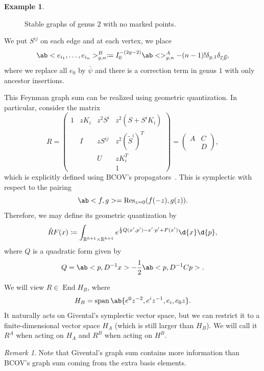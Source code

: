 \documentclass[10pt]{amsart}
\theoremstyle{definition}
\newtheorem{exm}[thm]{Example}
\theoremstyle{remark}
\newtheorem{rmk}[thm]{Remark}
\theoremstyle{plain}
\theoremstyle{definition}
\theoremstyle{remark}
\newcommand{\R}{\mathbb{R}}
\newcommand{\on}[1]{\operatorname{#1}}
\newcommand{\1}{\mathbf{1}}
\newcommand{\2}{\mathbf{2}}
\newcommand{\3}{\mathbf{3}}
\DeclareMathOperator{\End}{End}
\begin{document}
\begin{exm}
\begin{figure}[htpb]
\begin{center}
    \end{center}
    \caption{Stable graphs of genus $2$ with no marked points.}%
    \label{fig:stable graphs of genus 2}
    \end{figure}
    We put $S^{ij}$ on each edge and at each vertex, we place
    \[ \ab<e_{i_1}, \ldots, e_{i_n}>_{g,n}^{B} \coloneqq I_0^{-(2g-2)} \ab<>_{g,n}^A - (n-1)! \delta_{g,1} \delta_{\vec{\imath}, \vec{0}}, \]
    where we replace all $e_0$ by $\bar{\psi}$ and there is a correction term in genus $1$ with only ancestor insertions. 
\end{exm}

This Feynman graph sum can be realized using geometric quantization. In particular, consider the matrix
\[ R = \begin{pmatrix}
    1 & z K_i & z^2 S^i & z^2 (S + S^i K_i) \\
    & I & z S^{ij} & z^2 (\tilde{S}^i)^T \\
    & & U & z K_i^T \\
    & & & 1
\end{pmatrix} = \begin{pmatrix}
    A & C \\
    & D
\end{pmatrix}, \]
which is explicitly defined using BCOV's propagators~\cite{bcov}. This is symplectic with respect to the pairing
\[ \ab<f,g> = \on{Res}_{z=0} (f(-z), g(z)). \]
Therefore, we may define its geometric quantization by
\[ \hat{R} F(x) \coloneqq \int_{\R^{h+1} \times \R^{h+1}} e^{\frac{1}{2} Q(x',p') - x' \cdot p' + F(x')} \d{x} \d{p}, \]
where $Q$ is a quadratic form given by
\[ Q = \ab<p,D^{-1}x> - \frac{1}{2}\ab<p, D^{-1}C p>. \]

We will view $R \in \End H_B$, where
\[ H_B = \on{span} \ab\{ e^0 z^{-2}, e^i z^{-1}, e_i, e_0 z \}. \]
It naturally acts on Givental's symplectic vector space, but we can restrict it to a finite-dimensional vector space $H_A$ (which is still larger than $H_B$). We will call it $R^A$ when acting on $H_A$ and $R^B$ when acting on $H^B$.

\begin{rmk}
    Note that Givental's graph sum contains more information than BCOV's graph sum coming from the extra basis elements.
\end{rmk}
\end{document}
